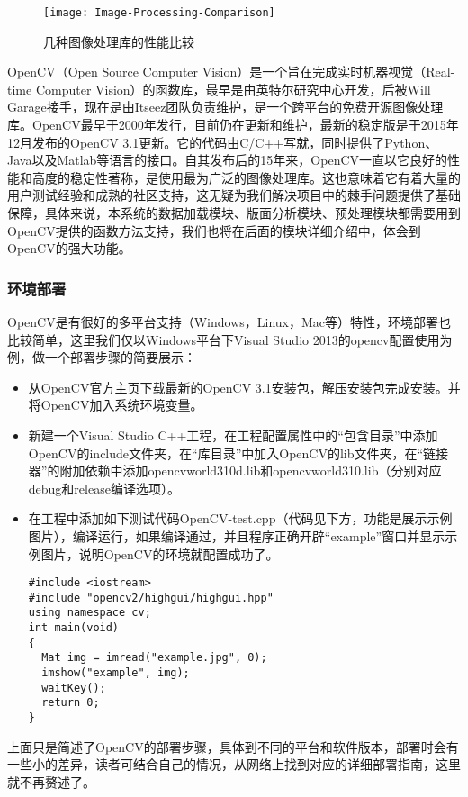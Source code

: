 \begin{figure}
	\centering
	\caption{几种图像处理库的性能比较}
	\texttt{[image: Image-Processing-Comparison]}
	\label{pic:image-processing-comparison}
\end{figure}

OpenCV（Open Source Computer Vision）是一个旨在完成实时机器视觉（Real-time Computer Vision）的函数库，最早是由英特尔研究中心开发，后被Will Garage接手，现在是由Itseez团队负责维护，是一个跨平台的免费开源图像处理库\citep{wiki:OpenCV}。OpenCV最早于2000年发行，目前仍在更新和维护，最新的稳定版是于2015年12月发布的OpenCV 3.1更新。它的代码由C/C++写就，同时提供了Python、Java以及Matlab等语言的接口\citep{wiki:OpenCV}。自其发布后的15年来，OpenCV一直以它良好的性能和高度的稳定性著称，是使用最为广泛的图像处理库。这也意味着它有着大量的用户测试经验和成熟的社区支持，这无疑为我们解决项目中的棘手问题提供了基础保障，具体来说，本系统的数据加载模块、版面分析模块、预处理模块都需要用到OpenCV提供的函数方法支持，我们也将在后面的模块详细介绍中，体会到OpenCV的强大功能。

\subsubsection*{环境部署}
OpenCV是有很好的多平台支持（Windows，Linux，Mac等）特性，环境部署也比较简单，这里我们仅以Windows平台下Visual Studio 2013的opencv配置使用为例，做一个部署步骤的简要展示：
\begin{itemize}
  \item 从\href{http://opencv.org/}{OpenCV官方主页}下载最新的OpenCV 3.1安装包，解压安装包完成安装。并将OpenCV加入系统环境变量。
  \item 新建一个Visual Studio C++工程，在工程配置属性中的“包含目录”中添加OpenCV的include文件夹，在“库目录”中加入OpenCV的lib文件夹，在“链接器”的附加依赖中添加opencvworld310d.lib和opencvworld310.lib（分别对应debug和release编译选项）。
  \item 在工程中添加如下测试代码OpenCV-test.cpp（代码见下方，功能是展示示例图片），编译运行，如果编译通过，并且程序正确开辟“example”窗口并显示示例图片，说明OpenCV的环境就配置成功了。
\begin{lstlisting}[label=OpenCV-test.cpp]
#include <iostream>
#include "opencv2/highgui/highgui.hpp"
using namespace cv;
int main(void)
{
  Mat img = imread("example.jpg", 0);
  imshow("example", img);
  waitKey();
  return 0;
}
\end{lstlisting}
\end{itemize}

上面只是简述了OpenCV的部署步骤，具体到不同的平台和软件版本，部署时会有一些小的差异，读者可结合自己的情况，从网络上找到对应的详细部署指南，这里就不再赘述了。

